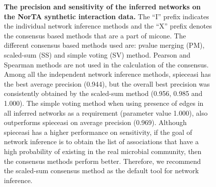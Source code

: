   \FloatBarrier
  \newpage
  \begin{figure}[H]
    \centering
    \caption{
      \textbf{The precision and sensitivity of the inferred networks on the NorTA synthetic interaction data.}
      The ``I'' prefix indicates the individual network inference methods and the ``X'' prefix denotes the consensus based methods that are a part of \ac{micone}.
      The different consensus based methods used are: pvalue merging (PM), scaled-sum (SS) and simple voting (SV) method.
      Pearson and Spearman methods are not used in the calculation of the consensus.
      Among all the independent network inference methods, \ac{spieceasi} has the best average precision (0.944), but the overall best precision was consistently obtained by the scaled-sum method (0.956, 0.985 and 1.000).
      The simple voting method when using presence of edges in all inferred networks as a requirement (parameter value 1.000), also outperforms \ac{spieceasi} on average precision (0.969).
      Although \ac{spieceasi} has a higher performance on sensitivity, if the goal of network inference is to obtain the list of associations that have a high probability of existing in the real microbial community, then the consensus methods perform better.
      Therefore, we recommend the scaled-sum consensus method as the default tool for network inference.
    }
    \label{fig:figure5}
  \end{figure}


